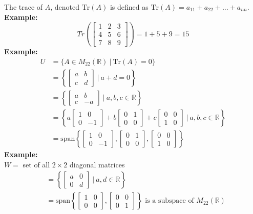 \documentclass[]{article}
\begin{document}
		The trace of $A$, denoted $\text{Tr}(A)$ is defined as $\text{Tr}(A)=a_{11}+a_{22}+...+a_{nn}$.\\
		{\bf Example:}
		$$Tr\left(
			\begin{bmatrix}
				{1}&{2}&{3}\\
				{4}&{5}&{6}\\
				{7}&{8}&{9}
			\end{bmatrix}\right)=1+5+9=15
		$$
		{\bf Example:}\\
		\begin{align*}
			U&=\{ A\in M_{22}(\mathbb{R})~|~\text{Tr}(A)=0 \}\\
			&=\left\{ \begin{bmatrix}{a}&{b}\\{c}&{d}\end{bmatrix}~|~a+d=0 \right\}\\
			&=\left\{ \begin{bmatrix}{a}&{b}\\{c}&{-a}\end{bmatrix}~|~a,b,c\in\mathbb{R} \right\}\\
			&=\left\{ a\begin{bmatrix}{1}&{0}\\{0}&{-1}\end{bmatrix}+b\begin{bmatrix}{0}&{1}\\{0}&{0}\end{bmatrix}+c\begin{bmatrix}{0}&{0}\\{1}&{0}\end{bmatrix}~|~a,b,c\in\mathbb{R} \right\}\\
			&=\text{span}\left\{ \begin{bmatrix}{1}&{0}\\{0}&{-1}\end{bmatrix},\begin{bmatrix}{0}&{1}\\{0}&{0}\end{bmatrix},\begin{bmatrix}{0}&{0}\\{1}&{0}\end{bmatrix} \right\}
		\end{align*}
		{\bf Example:}\\
		$W=$ set of all $2\times 2$ diagonal matrices
		\begin{align*}
			&=\left\{\begin{bmatrix}{a}&{0}\\{0}&{d}\end{bmatrix}~|~a,d\in\mathbb{R}\right\}\\
			&=\text{span}\left\{ \begin{bmatrix}{1}&{0}\\{0}&{0}\end{bmatrix},\begin{bmatrix}{0}&{0}\\{0}&{1}\end{bmatrix} \right\}\text{ is a subspace of }M_{22}(\mathbb{R})
		\end{align*}
\end{document}
